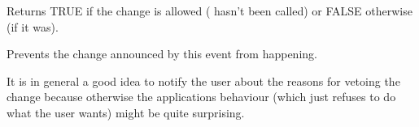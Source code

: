 
Returns TRUE if the change is allowed ( 
hasn't been called) or FALSE otherwise (if it was).

\label{wxnotifyeventveto}


Prevents the change announced by this event from happening.

It is in general a good idea to notify the user about the reasons for vetoing
the change because otherwise the applications behaviour (which just refuses to
do what the user wants) might be quite surprising.

